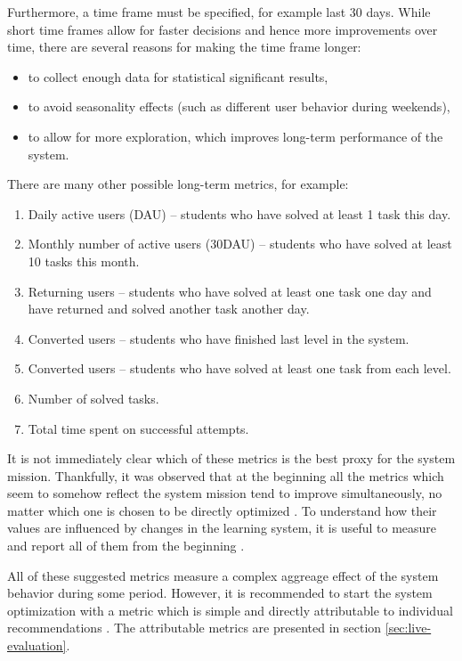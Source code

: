 Furthermore, a time frame must be specified, for example last 30 days.
While short time frames allow for faster decisions and hence more improvements over time,
there are several reasons for making the time frame longer:
\begin{itemize}
  \item to collect enough data for statistical significant results,
  \item to avoid seasonality effects (such as different user behavior during weekends),
  \item to allow for more exploration, which improves long-term performance of the system.
\end{itemize}

There are many other possible long-term metrics, for example:
\begin{enumerate}
  \item Daily active users (DAU) -- students who have solved at least 1 task this day.
  \item Monthly number of active users (30DAU) -- students who have solved at least 10 tasks this month.
  \item Returning users -- students who have solved at least one task one day and have returned and solved another task another day.
  \item Converted users -- students who have finished last level in the system.
  \item Converted users -- students who have solved at least one task from each level.
  \item Number of solved tasks.
  \item Total time spent on successful attempts.
\end{enumerate}

It is not immediately clear which of these metrics is the best proxy for the system mission.
Thankfully, it was observed that at the beginning all the metrics which seem to somehow
reflect the system mission tend to improve simultaneously, no matter which one
is chosen to be directly optimized \cite[][Rule \#12]{google-ml-rules}.
To understand how their values are influenced by changes in the learning system,
it is useful to measure and report all of them from the beginning
\cite[][Rule \#2]{google-ml-rules}.

All of these suggested metrics measure a complex aggreage effect of the system
behavior during some period.
However, it is recommended to start the system optimization with a metric which is simple
and directly attributable to individual recommendations \cite[][Rule \#12]{google-ml-rules}.
The attributable metrics are presented in section \ref{sec:live-evaluation}.

